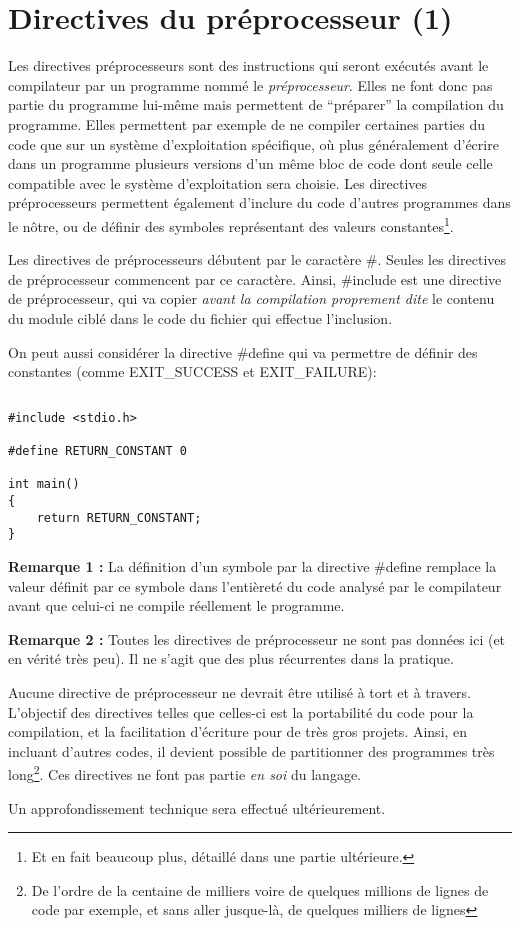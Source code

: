 \documentclass[../../../main.tex]{subfiles}
\begin{document}
\section{Directives du préprocesseur (1)}\label{sec:directives_pr_processeurs_1_}
Les directives préprocesseurs sont des instructions qui seront exécutés avant le compilateur par un programme nommé le \textit{préprocesseur}. Elles ne font donc pas partie du programme lui-même mais permettent de ``préparer'' la compilation du programme. Elles permettent par exemple de ne compiler certaines parties du code que sur un système d'exploitation spécifique, où plus généralement d'écrire dans un programme plusieurs versions d'un même bloc de code dont seule celle compatible avec le système d'exploitation sera choisie. Les directives préprocesseurs permettent également d'inclure du code d'autres programmes dans le nôtre, ou de définir des symboles représentant des valeurs constantes\footnote{Et en fait beaucoup plus, détaillé dans une partie ultérieure.}.
 
Les directives de préprocesseurs débutent par le caractère \#. Seules les directives de préprocesseur commencent par ce caractère. Ainsi, \textsf{\#include} est une directive de préprocesseur, qui va copier \textit{avant la compilation proprement dite} le contenu du module ciblé dans le code du fichier qui effectue l'inclusion.
 
On peut aussi considérer la directive \textsf{\#define} qui va permettre de définir des constantes (comme \textsf{EXIT\_SUCCESS} et \textsf{EXIT\_FAILURE}):
\begin{lstlisting}[title=Exemple]
\end{lstlisting}
\begin{verbatim}
#include <stdio.h>

#define RETURN_CONSTANT 0

int main()
{
	return RETURN_CONSTANT;
}
\end{verbatim}
\textbf{Remarque 1 :} La définition d'un symbole par la directive \textsf{\#define} remplace la valeur définit par ce symbole dans l'entièreté du code analysé par le compilateur avant que celui-ci ne compile réellement le programme.
 
\textbf{Remarque 2 :} Toutes les directives de préprocesseur ne sont pas données ici (et en vérité très peu). Il ne s'agit que des plus récurrentes dans la pratique.
 
Aucune directive de préprocesseur ne devrait être utilisé à tort et à travers. L'objectif des directives telles que celles-ci est la portabilité du code pour la compilation, et la facilitation d'écriture pour de très gros projets. Ainsi, en incluant d'autres codes, il devient possible de partitionner des programmes très long\footnote{De l'ordre de la centaine de milliers voire de	quelques millions de lignes de code par exemple, et sans aller jusque-là, de quelques milliers de lignes}. Ces directives ne font pas partie \textit{en soi} du langage.
 
Un approfondissement technique sera effectué ultérieurement.
\end{document}
